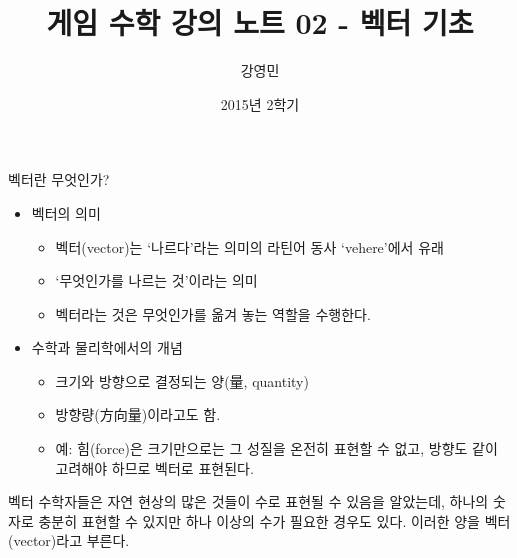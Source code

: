 \documentclass{beamer}
\title[게임수학 - 벡터기초]{ 게임 수학 강의 노트 02 - 벡터 기초}
\author{강영민}
\institute{동명대학교}
\date{2015년 2학기}
\begin{document}
\begin{frame}
  \titlepage
\end{frame}



\begin{frame}{벡터란 무엇인가?}
\begin{itemize}
\item 벡터의 의미
  \begin{itemize}
  \item 벡터(vector)는 ‘나르다’라는 의미의 라틴어 동사 ‘vehere'에서 유래
  \item ‘무엇인가를 나르는 것’이라는 의미
  \item 벡터라는 것은 무엇인가를 옮겨 놓는 역할을 수행한다.
  \end{itemize}
\end{itemize}

\begin{itemize}
\item 수학과 물리학에서의 개념
  \begin{itemize}
  \item 크기와 방향으로 결정되는 양(量, quantity)
  \item 방향량(方向量)이라고도  함.
  \item 예: 힘(force)은 크기만으로는 그 성질을 온전히 표현할 수 없고, 방향도 같이 고려해야 하므로 벡터로 표현된다.
  \end{itemize}
\end{itemize}

\begin{block}{벡터}
수학자들은 자연 현상의 많은 것들이 수로 표현될 수 있음을 알았는데, 하나의 숫자로 충분히 표현할 수 있지만 하나 이상의 수가 필요한 경우도 있다. 
이러한 양을 벡터(vector)라고 부른다.
\end{block}

\end{frame}

\end{document}
